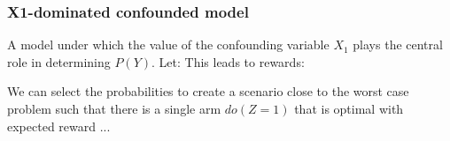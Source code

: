 \subsubsection{X1-dominated confounded model}
A model under which the value of the confounding variable $X_1$ plays the central role in determining $P(Y)$.  Let:
This leads to rewards:

We can select the probabilities to create a scenario close to the worst case problem such that there is a single arm $do(Z=1)$ that is optimal with expected reward ...

